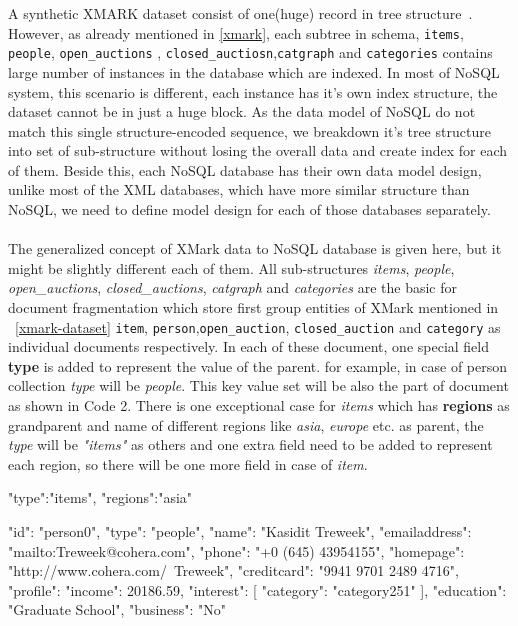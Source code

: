 A synthetic XMARK dataset consist of one(huge) record in tree structure~\cite{xmark/VIST}. However, as already mentioned in \ref{xmark}, each subtree in schema, \texttt{items}, \texttt{people}, \texttt{open\_auctions} , \texttt{closed\_auctiosn},\texttt{catgraph} and \texttt{categories} contains large number of instances in the database which are indexed. In most of NoSQL system, this scenario is different, each instance has it's own index structure, the dataset cannot be in just a huge block. As the data model of NoSQL do not match this single structure-encoded sequence, we breakdown it's tree structure into set of sub-structure without losing the overall data and create index for each of them.
Beside this, each NoSQL database has their own data model design, unlike most of the XML databases, which have more similar structure than NoSQL, we need to define model design for each of those databases separately. 
\\
\\
The generalized concept of XMark data to NoSQL database is given here, but it might be slightly  different each of them.
 All sub-structures \textit{items}, \textit{people}, \textit{open\_auctions}, \textit{closed\_auctions}, \textit{catgraph} and \textit{categories} are the basic for document fragmentation which store first group entities of XMark mentioned in ~\ref{xmark-dataset} \texttt{item}, \texttt{person},\texttt{open\_auction}, \texttt{closed\_auction} and \texttt{category} as individual documents respectively. In each of these document, one special field \textbf{type} is added to represent the value of the parent. for example, in case of person collection \textit{type} will be \textit{people}. This key value set will be also the part of document as shown in Code 2. There is one exceptional case for \textit{items}  which has \textbf{regions} as grandparent and name of different regions like \textit{asia}, \textit{europe} etc. as parent, the \textit{type} will be \textit{"items"} as others and one extra field need to be added to represent each region, so there will be one more field in case of \textit{item}.

 \begin{fakeJSON}[label=json,caption=\textit{doctype} and \textit{regions} for item which has region name \textit{asia}]
 	"type":"items",
 	"regions":"asia"
 \end{fakeJSON}
  
 \label{code:nosql-person0}
\begin{fakeJSON}[label=json,caption=General NoSQL data representation of XMARk data]
	{
		"id": "person0",
		"type": "people",
		"name": "Kasidit Treweek",
		"emailaddress": "mailto:Treweek@cohera.com",
		"phone": "+0 (645) 43954155",
		"homepage": "http://www.cohera.com/~Treweek",
		"creditcard": "9941 9701 2489 4716",
		"profile": {
			"income": 20186.59,
			"interest": [{
				"category": "category251"
			}],
			"education": "Graduate School",
			"business": "No"
		}
	}
\end{fakeJSON} 

